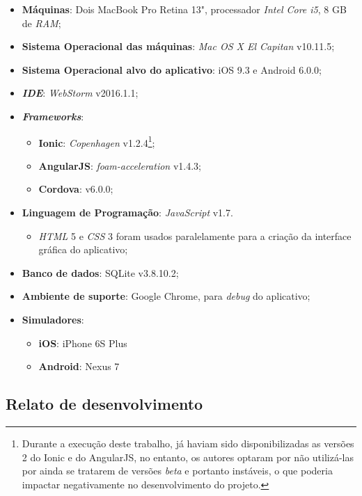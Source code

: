 \begin{itemize}
    \item \textbf{Máquinas}: Dois MacBook Pro Retina 13", processador \textit{Intel Core i5}, 8 GB de \textit{RAM};
    \item \textbf{Sistema Operacional das máquinas}: \textit{Mac OS X El Capitan} v10.11.5;
    \item \textbf{Sistema Operacional alvo do aplicativo}: iOS 9.3 e Android 6.0.0;
    \item \textbf{\textit{IDE}}: \textit{WebStorm} v2016.1.1;
    \item \textbf{\textit{Frameworks}}:
    \begin{itemize}
        \item \textbf{Ionic}: \textit{Copenhagen} v1.2.4\footnote{Durante a execução deste trabalho, já haviam sido disponibilizadas as versões 2 do Ionic e do AngularJS, no entanto,
        	os autores optaram por não utilizá-las por ainda se tratarem de versões \textit{beta} e portanto instáveis, o que poderia 
        	impactar negativamente no desenvolvimento do projeto.\label{note1}};
        \item \textbf{AngularJS}: \textit{foam-acceleration} v1.4.3;
        
        \item \textbf{Cordova}: v6.0.0;
    \end{itemize}
    \item \textbf{Linguagem de Programação}: \textit{JavaScript} v1.7. 
    \begin{itemize}
        \item \textit{HTML} 5 e \textit{CSS} 3 foram usados paralelamente para a criação da interface gráfica do aplicativo;
    \end{itemize}
    \item \textbf{Banco de dados}: SQLite v3.8.10.2;
    \item \textbf{Ambiente de suporte}: Google Chrome, para \textit{debug} do aplicativo;
    \item \textbf{Simuladores}: 
    \begin{itemize}
        \item \textbf{iOS}: iPhone 6S Plus
        \item \textbf{Android}: Nexus 7
    \end{itemize}
\end{itemize}

\subsection{Relato de desenvolvimento} \label{subsec:experienciasdev}


